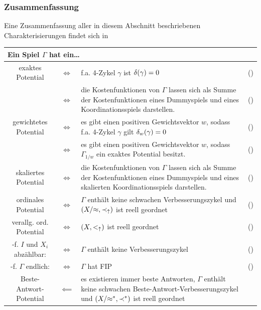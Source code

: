 \subsubsection{Zusammenfassung}

Eine Zusammenfassung aller in diesem Abschnitt beschriebenen Charakterisierungen findet sich in 

\begin{table}\centering\renewcommand*{\arraystretch}{1.2}
	\begin{tabularx}{\textwidth}{ccXr}
		\multicolumn{4}{l}{Ein Spiel $\Gamma$ hat ein\dots} \\\hline\hline
		exaktes Potential 				& $\iff$	& f.a. 4-Zykel $\gamma$ ist $\delta(\gamma)=0$	
		& (\Cref{satz:CharExPot}) 	\\
										& $\iff$	& die Kostenfunktionen von $\Gamma$ lassen sich als Summe der Kostenfunktionen eines Dummyspiels und eines
		Koordinationsspiels darstellen.
		& (\Cref{satz:CharExPotAlt})\\\hline
		gewichtetes Potential			& $\iff$	& es gibt einen positiven Gewichtsvektor $w$, sodass f.a. 4-Zykel $\gamma$ gilt $\delta_w(\gamma)=0$	
		& (\Cref{satz:CharGewPot})	\\
										& $\iff$	& es gibt einen positiven Gewichtsvektor $w$, sodass $\Gamma_{1/w}$ ein exaktes Potential besitzt.	
		& (\Cref{beob:ZshExGewPot})	\\\hline
		skaliertes Potential			& $\iff$	& die Kostenfunktionen von $\Gamma$ lassen sich als Summe der Kostenfunktionen eines Dummyspiels und eines skalierten Koordinationsspiels darstellen.
		& (\Cref{satz:CharSkalPot})	\\\hline
		ordinales Potential				& $\iff$	& $\Gamma$ enthält keine schwachen Verbesserungszykel und $(X/{\approx}, \prec_\uparrow)$ ist reell geordnet
		& (\Cref{satz:CharOrdPot})	\\\hline
		verallg. ord. Potential			& $\iff$	& $(X, <_\uparrow)$ ist reell geordnet
		& (\Cref{satz:CharVerallOrdPot})\\
		-f. $I$ und $X_i$ abzählbar:	& $\iff$	& $\Gamma$ enthält keine Verbesserungszykel
		& (\Cref{kor:CharExVerOrdPotabzIundXi})\\
		-f. $\Gamma$ endlich:			& $\iff$	& $\Gamma$ hat FIP
		& (\Cref{kor:CharExVerOrdFIP})\\\hline
		Beste-Antwort-Potential			& $\impliedby$	& es existieren immer beste Antworten, $\Gamma$ enthält keine schwachen Beste-Antwort-Verbesserungszykel und $(X/{\approx^\ast}, \prec^\ast)$ ist reell geordnet

\end{tabularx}
\end{table}

